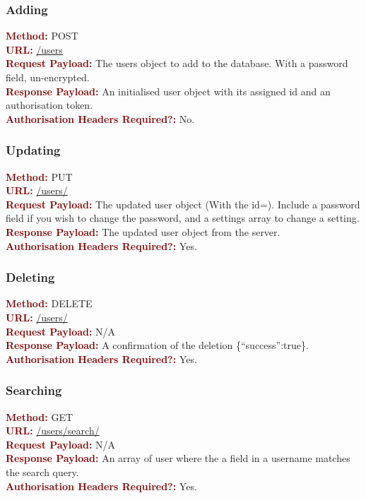 \documentclass[11pt,a4paper]{report}
\begin{document}
\subsubsection{Adding}
\textbf{\textcolor{Maroon}{Method:}} POST\\
\textbf{\textcolor{Maroon}{URL:}} \url{/users}\\
\textbf{\textcolor{Maroon}{Request Payload:}} The users object to add to the database. With a password field, un-encrypted.\\
\textbf{\textcolor{Maroon}{Response Payload:}} An initialised user object with its assigned id and an authorisation token.\\
\textbf{\textcolor{Maroon}{Authorisation Headers Required?:}} No.

\subsubsection{Updating}
\textbf{\textcolor{Maroon}{Method:}} PUT\\
\textbf{\textcolor{Maroon}{URL:}} \url{/users/}\\
\textbf{\textcolor{Maroon}{Request Payload:}} The updated user object (With the id=). Include a password field if you wish to change the password, and a settings array to change a setting.\\
\textbf{\textcolor{Maroon}{Response Payload:}} The updated user object from the server.\\
\textbf{\textcolor{Maroon}{Authorisation Headers Required?:}} Yes.

\subsubsection{Deleting}
\textbf{\textcolor{Maroon}{Method:}} DELETE\\
\textbf{\textcolor{Maroon}{URL:}} \url{/users/}\\
\textbf{\textcolor{Maroon}{Request Payload:}} N/A\\
\textbf{\textcolor{Maroon}{Response Payload:}} A confirmation of the deletion \{``success'':true\}.\\
\textbf{\textcolor{Maroon}{Authorisation Headers Required?:}} Yes.

\subsubsection{Searching}
\textbf{\textcolor{Maroon}{Method:}} GET\\
\textbf{\textcolor{Maroon}{URL:}} \url{/users/search/}\\
\textbf{\textcolor{Maroon}{Request Payload:}} N/A\\
\textbf{\textcolor{Maroon}{Response Payload:}} An array of user where the a field in a username matches the search query.\\
\textbf{\textcolor{Maroon}{Authorisation Headers Required?:}} Yes.
\end{document}
